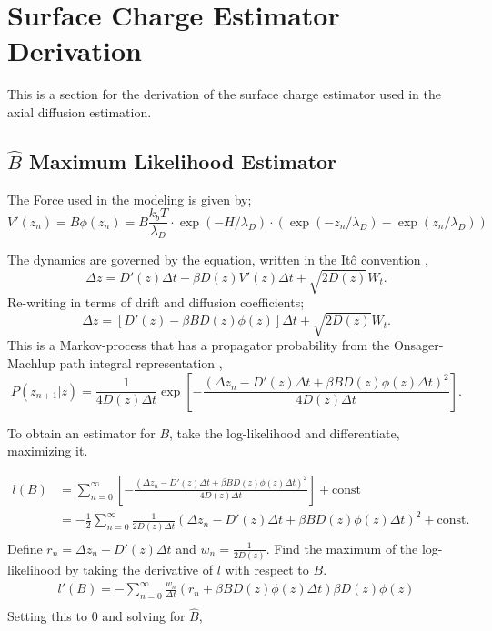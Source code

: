 \chapter{Surface Charge Estimator Derivation}
\label{app:1}

This is a section for the derivation of the surface charge estimator used in the axial diffusion estimation.

\section{$\hat B$ Maximum Likelihood Estimator}

The Force used in the modeling is given by;
\begin{equation}
    V'(z_n) = B\phi(z_n)= B  \frac{k_b T}{\lambda_D} \cdot \exp(-H/\lambda_D) \cdot (\exp(-z_n/\lambda_D) - \exp(z_n/\lambda_D))
\end{equation}

The dynamics are governed by the equation, written in the Itô convention \cite{gardiner2009stochastic}, 
\begin{equation}
    \Delta z = D'(z) \Delta t - \beta D(z) V'(z) \Delta t + \sqrt{2 D(z)} W_t.
\end{equation}
Re-writing in terms of drift and diffusion coefficients;
\begin{equation}
    \Delta z = \left[ D'(z)  - \beta B D(z) \phi(z)  \right] \Delta t+ \sqrt{2 D(z)} W_t.
\end{equation}
This is a Markov-process that has a propagator probability from the Onsager-Machlup path integral representation \cite{onsager1953fluctuations1, machlup1953fluctuations2}, 
\begin{equation}
    P(z_{n+1}|z) = \frac{1}{4D(z)\Delta t} \exp\left[-\frac{\left(\Delta z_n - D'(z)\Delta t  + \beta B D(z) \phi(z) \Delta t\right)^2}{4D(z) \Delta t}\right].
\end{equation} 

To obtain an estimator for $B$, take the log-likelihood and differentiate, maximizing it. 

\begin{align*}
l(B) &= \sum_{n=0}^\infty \left[-\frac{\left(\Delta z_n - D'(z) \Delta t  + \beta B D(z) \phi(z) \Delta t\right)^2}{4D(z) \Delta t}\right] + \text{const} \\
&= - \frac{1}{2}\sum_{n=0}^\infty\frac{1}{2D(z) \Delta t} \left(\Delta z_n - D'(z)\Delta t  + \beta B D(z)\phi(z)\Delta t\right)^2 + \text{const}. \\
\end{align*}
Define $r_n = \Delta z_n - D'(z) \Delta t$ and $w_n = \frac{1}{2D(z)}$. Find the maximum of the log-likelihood by taking the derivative of $l$ with respect to $B$.
\begin{align*}
    l'(B) = -\sum_{n=0}^\infty\frac{w_n}{\Delta t} \left(r_n  + \beta B D(z)\phi(z)\Delta t\right)\beta D(z) \phi(z) \\
\end{align*}
Setting this to 0 and solving for $\hat B$,

